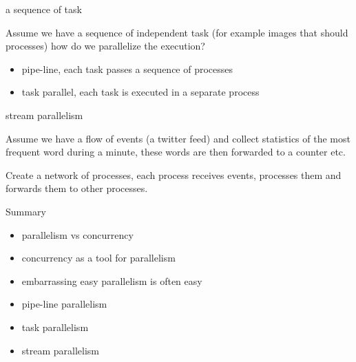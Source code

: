 \begin{frame}{a sequence of task}

  Assume we have a sequence of independent task (for example images
  that should processes) how do we parallelize the execution?

\pause\vspace{10pt}
\begin{itemize}
\pause\item pipe-line, each task passes a sequence of processes 
\pause\item task parallel, each task is executed in a separate process
\end{itemize}

\pause\vspace{20pt}{\em Pros and cons?}

\end{frame}

\begin{frame}{stream parallelism}

  Assume we have a flow of events (a twitter feed) and collect
  statistics of the most frequent word during a minute, these words
  are then forwarded to a counter etc.

\pause\vspace{10pt}

  Create a network of processes, each process receives events,
  processes them and forwards them to other processes.

\pause\vspace{20pt}{\em Apache Storm.}


\end{frame}

\begin{frame}{Summary}


\begin{itemize}
\pause\item parallelism vs concurrency
\pause\item concurrency as a tool for parallelism 
\pause\item embarrassing easy parallelism is often easy
\pause\item pipe-line parallelism 
\pause\item task parallelism 
\pause\item stream parallelism
\end{itemize}

\end{frame}


